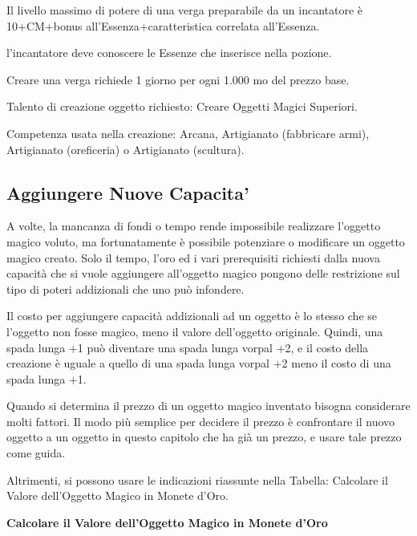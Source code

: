 \documentclass[a4paper,11pt,twoside,openany]{book}
\begin{document}
Il livello massimo di potere di una verga preparabile da un incantatore è 10+CM+bonus all'Essenza+caratteristica correlata all'Essenza.

l'incantatore deve conoscere le Essenze che inserisce nella pozione.

Creare una verga richiede 1 giorno per ogni 1.000 mo del prezzo base.

Talento di creazione oggetto richiesto: Creare Oggetti Magici Superiori.

Competenza usata nella creazione: Arcana, Artigianato (fabbricare armi), Artigianato (oreficeria) o Artigianato (scultura).

\subsection{Aggiungere Nuove Capacita'}

A volte, la mancanza di fondi o tempo rende impossibile realizzare l'oggetto magico voluto, ma fortunatamente è possibile potenziare o modificare un oggetto magico creato. Solo il tempo, l'oro ed i vari prerequisiti richiesti dalla nuova capacità che si vuole aggiungere all'oggetto magico pongono delle restrizione sul tipo di poteri addizionali che uno può infondere.

Il costo per aggiungere capacità addizionali ad un oggetto è lo stesso che se l'oggetto non fosse magico, meno il valore dell'oggetto originale. Quindi, una spada lunga +1 può diventare una spada lunga vorpal +2, e il costo della creazione è uguale a quello di una spada lunga vorpal +2 meno il costo di una spada lunga +1.

Quando si determina il prezzo di un oggetto magico inventato bisogna considerare molti fattori. Il modo più semplice per decidere il prezzo è confrontare il nuovo oggetto a un oggetto in questo capitolo che ha già un prezzo, e usare tale prezzo come guida.

Altrimenti, si possono usare le indicazioni riassunte nella Tabella: Calcolare il Valore dell'Oggetto Magico in Monete d'Oro.

\bigskip

\textbf{Calcolare il Valore dell'Oggetto Magico in Monete d'Oro}
\end{document}
